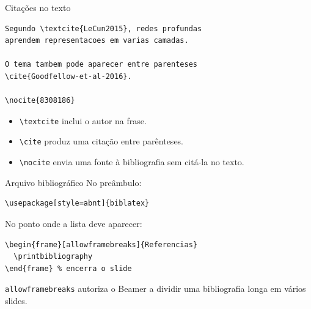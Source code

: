 \begin{frame}[fragile]{Citações no texto}
\begin{lstlisting}
Segundo \textcite{LeCun2015}, redes profundas
aprendem representacoes em varias camadas.

O tema tambem pode aparecer entre parenteses
\cite{Goodfellow-et-al-2016}.

\nocite{8308186}
\end{lstlisting}

\begin{itemize}
    \item \verb|\textcite| inclui o autor na frase.
    \item \verb|\cite| produz uma citação entre parênteses.
    \item \verb|\nocite| envia uma fonte à bibliografia sem citá-la no texto.
\end{itemize}
\end{frame}

\begin{frame}[fragile]{Arquivo bibliográfico}
No preâmbulo:
\begin{lstlisting}
\usepackage[style=abnt]{biblatex}

\end{lstlisting}

No ponto onde a lista deve aparecer:
\begin{lstlisting}
\begin{frame}[allowframebreaks]{Referencias}
  \printbibliography
\end{frame} % encerra o slide
\end{lstlisting}

\verb|allowframebreaks| autoriza o Beamer a dividir uma bibliografia longa em vários slides.
\end{frame}
